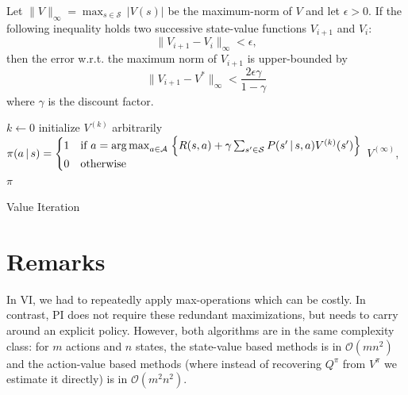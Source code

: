 		\begin{theorem}
			Let \( \lVert V \rVert_\infty = \max_{s \in \mathcal{S}} \, \lvert V(s) \rvert \) be the maximum-norm of \(V\) and let \(\epsilon > 0\). If the following inequality holds two successive state-value functions \( V_{i + 1} \) and \( V_i \):
			\begin{equation}
				\lVert V_{i + 1} - V_i \rVert_\infty < \epsilon,
			\end{equation}
			then the error w.r.t. the maximum norm of \(V_{i + 1}\) is upper-bounded by
			\begin{equation}
				\lVert V_{i + 1} - V^\ast \rVert_\infty < \frac{2 \epsilon \gamma}{1 - \gamma}
			\end{equation}
			where \(\gamma\) is the discount factor.
		\end{theorem}

		\begin{algorithm}  \DontPrintSemicolon
			\( k \gets 0 \) \;
			initialize \( V^{(k)} \) arbitrarily \;
			\(
				\pi(a \,\vert\, s) =
					\begin{cases}
						1 & \text{if }a = \operatorname*{arg\,max}_{a \in \mathcal{A}} \;\Bigl\{ R(s, a) + \gamma \sum_{s' \in \mathcal{S}} P(s' \,\vert\, s, a) V^{(k)}(s') \Bigr\} \\
						0 & \text{otherwise}
					\end{cases}
			\) \;
			\Return \( V^{(\infty)} \), \( \pi \)
			\caption{Value Iteration}
			\label{alg:vi}
		\end{algorithm}

	\section{Remarks}
		In \ac{VI}, we had to repeatedly apply max-operations which can be costly. In contrast, \ac{PI} does not require these redundant maximizations, but needs to carry around an explicit policy. However, both algorithms are in the same complexity class: for \(m\) actions and \(n\) states, the state-value based methods is in \( \mathcal{O}(m n^2) \) and the action-value based methods (where instead of recovering \(Q^\pi\) from \(V^\pi\) we estimate it directly) is in \( \mathcal{O}(m^2 n^2) \).

